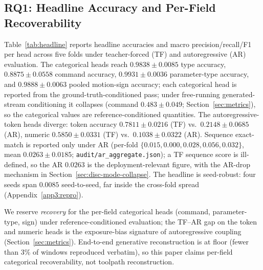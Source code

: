 \documentclass[sensors,article,submit,moreauthors,pdftex]{Definitions/mdpi}
\begin{document}
\subsection{RQ1: Headline Accuracy and Per-Field Recoverability}
\label{sec:results-headline}

Table~\ref{tab:headline} reports headline accuracies and macro precision/recall/F1 per head across five folds under teacher-forced (TF) and autoregressive (AR) evaluation. The categorical heads reach $0.9838 \pm 0.0085$ type accuracy, $0.8875 \pm 0.0558$ command accuracy, $0.9931 \pm 0.0036$ parameter-type accuracy, and $0.9888 \pm 0.0063$ pooled motion-sign accuracy; each categorical head is reported from the ground-truth-conditioned pass; under free-running generated-stream conditioning it collapses (command $0.483 \pm 0.049$; Section~\ref{sec:metrics}), so the categorical values are reference-conditioned quantities. The autoregressive-token heads diverge: token accuracy $0.7811 \pm 0.0216$ (TF) vs.\ $0.2148 \pm 0.0685$ (AR), numeric $0.5850 \pm 0.0331$ (TF) vs.\ $0.1038 \pm 0.0322$ (AR). Sequence exact-match is reported only under AR (per-fold $\{0.015, 0.000, 0.028, 0.056, 0.032\}$, mean $0.0263 \pm 0.0185$; \texttt{audit/ar\_aggregate.json}); a TF sequence score is ill-defined, so the AR $0.0263$ is the deployment-relevant figure, with the AR-drop mechanism in Section~\ref{sec:disc-mode-collapse}. The headline is seed-robust: four seeds span $0.0085$ seed-to-seed, far inside the cross-fold spread (Appendix~\ref{app3:repro}).

We reserve \emph{recovery} for the per-field categorical heads (command, parameter-type, sign) under reference-conditioned evaluation; the TF--AR gap on the token and numeric heads is the exposure-bias signature of autoregressive coupling (Section~\ref{sec:metrics}). End-to-end generative reconstruction is at floor (fewer than $3\%$ of windows reproduced verbatim), so this paper claims per-field categorical recoverability, not toolpath reconstruction.
\end{document}
